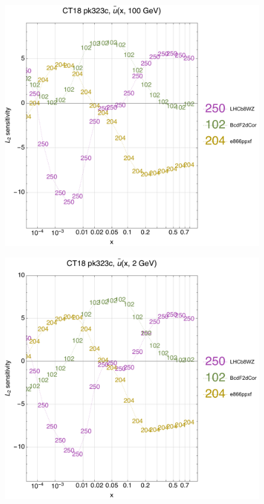 \documentclass[10pt,aps,prd,floatfix,titlepage]{revtex4}
\begin{document}
\clearpage
\begin{figure}
\includegraphics[width=\textwidth,height=0.44\textheight,keepaspectratio]{1/ifl-1_ct18nn_L2_q100_Sf_1.pdf}
\caption{}
\end{figure}
\begin{figure}
\includegraphics[width=\textwidth,height=0.44\textheight,keepaspectratio]{1/ifl-1_ct18nn_L2_q2_Sf_1.pdf}
\caption{}
\end{figure}
\end{document}
